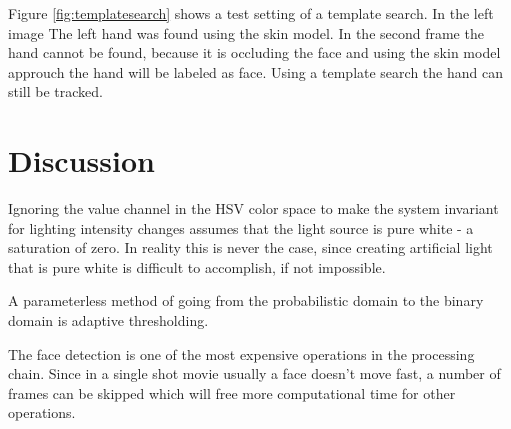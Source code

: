 Figure \ref{fig:templatesearch} shows a test setting of a template search. In the left image The left hand was found using the skin model. In the second frame the hand cannot be found, because it is occluding the face and using the skin model approuch the hand will be labeled as face. Using a template
search the hand can still be tracked.


\section{Discussion}
Ignoring the value channel in the HSV color space to make the system invariant for lighting intensity changes assumes that the light source is pure white - a saturation of zero. In reality this is never the case, since creating artificial light that is pure white is difficult to accomplish, if not impossible.

A parameterless method of going from the probabilistic domain to the binary domain is adaptive thresholding.

The face detection is one of the most expensive operations in the processing chain. Since in a single shot movie usually a face doesn't move fast, a number of frames can be skipped which will free more computational time for other operations.

